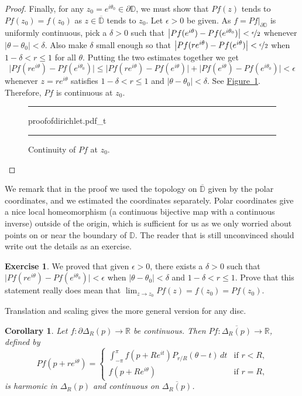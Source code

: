 \documentclass[12pt,openany]{book}
\newcommand{\sabs}[1]{\lvert {#1} \rvert}
\newcommand{\babs}[1]{\bigl\lvert {#1} \bigr\rvert}
\newcommand{\R}{{\mathbb{R}}}
\newcommand{\D}{{\mathbb{D}}}
\theoremstyle{plain}
\newtheorem{cor}[thm]{Corollary}
\theoremstyle{remark}
\theoremstyle{definition}
\newenvironment{exbox}{%
    \def\FrameCommand{\vrule width 1pt \relax\hspace{10pt}}%
    \MakeFramed{\advance\hsize-\width\FrameRestore}%
}{%
    \endMakeFramed
}
\newenvironment{myfig}{%
\begin{figure}[h!t]
\noindent\rule{\textwidth}{0.5pt}\vspace{12pt}\par\centering}%
{\par\noindent\rule{\textwidth}{0.5pt}
\end{figure}}
\theoremstyle{exercise}
\newtheorem{exercise}{Exercise}[section]
\theoremstyle{example}
\newcommand{\figureref}[1]{\hyperref[#1]{Figure~\ref*{#1}}}
\begin{document}
\begin{proof}
Finally, for any $z_0 = e^{i\theta_0} \in \partial \D$,
we must show that
$Pf(z)$ tends to $Pf(z_0)=f(z_0)$ as $z \in \overline{\D}$ tends to $z_0$.
Let $\epsilon > 0$ be given.  As $f = Pf|_{\partial \D}$ is
uniformly continuous, pick a $\delta > 0$ such that
$\babs{Pf(e^{i\theta})-Pf(e^{i\theta_0})} < \nicefrac{\epsilon}{2}$
whenever $\sabs{\theta-\theta_0} < \delta$.
Also make $\delta$ small enough so that $\babs{Pf(re^{i
\theta})-Pf(e^{i\theta})} < \nicefrac{\epsilon}{2}$
when $1 - \delta < r \leq 1$ for all $\theta$.
Putting the two estimates together we get
\begin{equation*}
\babs{Pf(re^{i\theta})-Pf(e^{i\theta_0})}
\leq
\babs{Pf(re^{i\theta})-Pf(e^{i\theta})}
+
\babs{Pf(e^{i\theta})-Pf(e^{i\theta_0})}
< \epsilon
\end{equation*}
whenever $z=re^{i\theta}$ satisfies $1 - \delta < r \leq 1$ and
$\sabs{\theta-\theta_0} < \delta$.
See \figureref{fig:proofofdirichlet}.
Therefore, $Pf$ is
continuous at $z_0$.
\begin{myfig}
{proofofdirichlet.pdf_t}
\caption{Continuity of $Pf$ at $z_0$.\label{fig:proofofdirichlet}}
\end{myfig}
\end{proof}

We remark that in the proof we used the topology on $\overline{\D}$
given by the polar coordinates, and we estimated the coordinates separately.
Polar coordinates give a nice local homeomorphism
(a continuous bijective map with a continuous inverse) outside of
the origin, which is sufficient for us as we only worried about points
on or near the boundary of $\D$.  The reader that is still unconvinced
should write out the details as an exercise.

\begin{exbox}
\begin{exercise}
We proved that given $\epsilon > 0$, there exists a $\delta > 0$ such that
$\babs{Pf(re^{i\theta})-Pf(e^{i\theta_0})} < \epsilon$
when $\sabs{\theta-\theta_0} < \delta$ and
$1 - \delta < r \leq 1$.  Prove that this statement really does mean that
$\lim_{z \to z_0} Pf(z) = f(z_0) = Pf(z_0)$.
\end{exercise}
\end{exbox}

Translation and scaling gives the more general version for
any disc.

\begin{cor} \label{cor:dirichsol}
Let $f \colon \partial \Delta_R(p) \to \R$ be continuous.
Then
$Pf \colon \overline{\Delta_R(p)} \to \R$, defined by
%
\begin{equation*}
Pf(p + re^{i\theta})
=
\begin{cases}
\int_{-\pi}^\pi f(p+Re^{it}) P_{r/R}(\theta-t) \, dt
&
\text{if $r < R$,} \\
f(p+Re^{i\theta}) & \text{if $r=R$,}
\end{cases}
\end{equation*}
is harmonic in $\Delta_R(p)$ and continuous on $\overline{\Delta_R(p)}$.
\end{cor}
\end{document}
